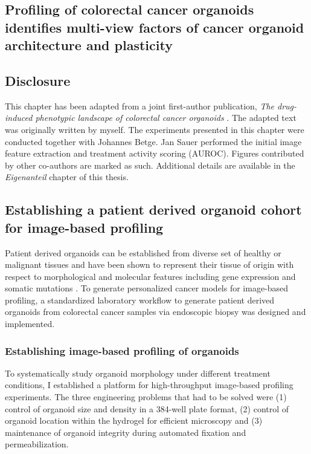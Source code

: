 \begin{flushleft}
\chapter{Profiling of colorectal cancer organoids identifies multi-view factors of cancer organoid architecture and plasticity}


\section{Disclosure}
This chapter has been adapted from a joint first-author publication, \textit{The drug-induced phenotypic landscape of colorectal cancer organoids} \parencite{betgeDruginducedPhenotypicLandscape2022}. The adapted text was originally written by myself. The experiments presented in this chapter were conducted together with Johannes Betge. Jan Sauer performed the initial image feature extraction and treatment activity scoring (AUROC). Figures contributed by other co-authors are marked as such. Additional details are available in the \textit{Eigenanteil} chapter of this thesis.

\section{Establishing a patient derived organoid cohort for image-based profiling}

Patient derived organoids can be established from diverse set of healthy or malignant tissues and have been shown to represent their tissue of origin with respect to morphological and molecular features including gene expression and somatic mutations \parencite{Fujii2016-ax, vandeweteringProspectiveDerivationLiving2015, satoLongtermExpansionEpithelial2011}. To generate personalized cancer models for image-based profiling, a standardized laboratory workflow to generate patient derived organoids from colorectal cancer samples via endoscopic biopsy was designed and implemented. 

\subsection{Establishing image-based profiling of organoids}
To systematically study organoid morphology under different treatment conditions, I established a platform for high-throughput image-based profiling experiments. The three engineering problems that had to be solved were (1) control of organoid size and density in a 384-well plate format, (2) control of organoid location within the hydrogel for efficient microscopy and (3) maintenance of organoid integrity during automated fixation and permeabilization. 



\end{flushleft}
